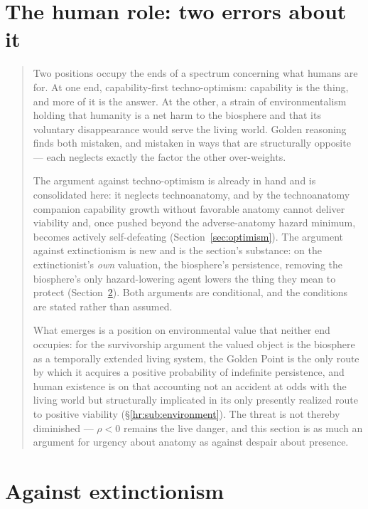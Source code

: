 \documentclass[11pt]{article}
\theoremstyle{plain}
\theoremstyle{definition}
\theoremstyle{remark}
\begin{document}
\section{The human role: two errors about it}\label{sec:errors}


\begin{quote}\small
Two positions occupy the ends of a spectrum concerning what humans are
for. At one end, capability-first techno-optimism: capability is the
thing, and more of it is the answer. At the other, a strain of environmentalism holding
that humanity is a net harm to the biosphere and that its voluntary
disappearance would serve the living world. Golden reasoning finds both
mistaken, and mistaken in ways that are structurally opposite --- each
neglects exactly the factor the other over-weights.

The argument against techno-optimism is already in hand and is
consolidated here: it neglects technoanatomy, and by
the technoanatomy companion \cite{TechnoC} capability growth without favorable
anatomy cannot deliver viability and, once pushed beyond the
adverse-anatomy hazard minimum, becomes actively self-defeating
(Section~\ref{sec:optimism}). The argument against extinctionism is new and
is the section's substance: on the extinctionist's \emph{own} valuation, the biosphere's persistence, removing the biosphere's only
hazard-lowering agent lowers the thing they mean to protect
(Section~\ref{sec:extinction}). Both arguments are conditional, and the
conditions are stated rather than assumed.

What emerges is a position on environmental value that neither end
occupies: for the survivorship argument the valued object is the
biosphere as a temporally extended living system, the Golden Point is
the only route by which it acquires a positive probability of
indefinite persistence, and human
existence is on that accounting not an accident at odds with the living
world but structurally implicated in its only presently realized route
to positive viability
(\S\ref{hr:sub:environment}). The threat is not thereby diminished ---
$\rho<0$ remains the live danger, and this section is as much an
argument for urgency about anatomy as against despair about presence.
\end{quote}





\section{Against extinctionism}\label{sec:extinction}
\end{document}
